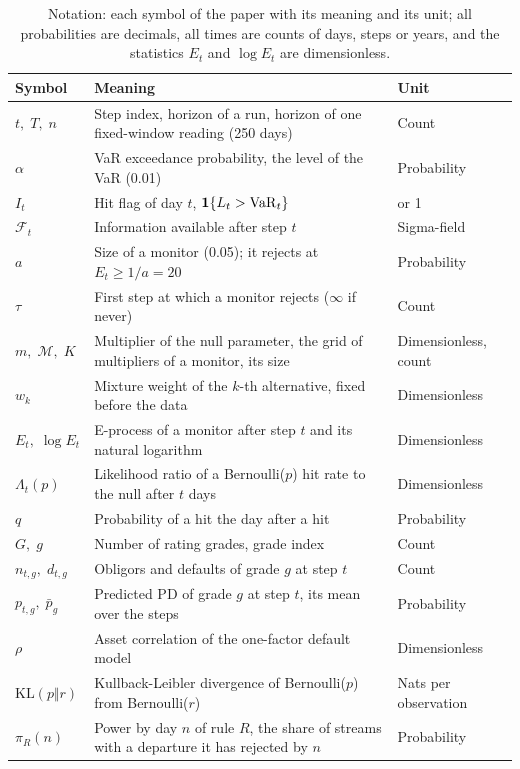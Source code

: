 \begin{table}[htbp]
\centering
\small
\caption{Notation: each symbol of the paper with its meaning and its unit; all probabilities are decimals, all times are counts of days, steps or years, and the statistics $E_t$ and $\log E_t$ are dimensionless.}
\label{tab:notation}
\begin{tabularx}{\textwidth}{>{\raggedright\arraybackslash}p{2.6cm}>{\raggedright\arraybackslash}X>{\raggedright\arraybackslash}p{3.3cm}}
\toprule
Symbol & Meaning & Unit \\
\midrule
$t,\;T,\;n$ & Step index, horizon of a run, horizon of one fixed-window reading (250 days) & Count \\
$\alpha$ & VaR exceedance probability, the level of the VaR (0.01) & Probability \\
$I_t$ & Hit flag of day $t$, $\mathbf{1}\{L_t>\operatorname{VaR}_t\}$ & 0 or 1 \\
$\mathcal F_t$ & Information available after step $t$ & Sigma-field \\
$a$ & Size of a monitor (0.05); it rejects at $E_t\ge 1/a=20$ & Probability \\
$\tau$ & First step at which a monitor rejects ($\infty$ if never) & Count \\
$m,\;\mathcal M,\;K$ & Multiplier of the null parameter, the grid of multipliers of a monitor, its size & Dimensionless, count \\
$w_k$ & Mixture weight of the $k$-th alternative, fixed before the data & Dimensionless \\
$E_t,\;\log E_t$ & E-process of a monitor after step $t$ and its natural logarithm & Dimensionless \\
$\Lambda_{t}(p)$ & Likelihood ratio of a Bernoulli($p$) hit rate to the null after $t$ days & Dimensionless \\
$q$ & Probability of a hit the day after a hit & Probability \\
$G,\;g$ & Number of rating grades, grade index & Count \\
$n_{t,g},\;d_{t,g}$ & Obligors and defaults of grade $g$ at step $t$ & Count \\
$p_{t,g},\;\bar p_g$ & Predicted PD of grade $g$ at step $t$, its mean over the steps & Probability \\
$\rho$ & Asset correlation of the one-factor default model & Dimensionless \\
$\mathrm{KL}(p\Vert r)$ & Kullback-Leibler divergence of Bernoulli($p$) from Bernoulli($r$) & Nats per observation \\
$\pi_R(n)$ & Power by day $n$ of rule $R$, the share of streams with a departure it has rejected by $n$ & Probability \\
\bottomrule
\end{tabularx}
\end{table}

